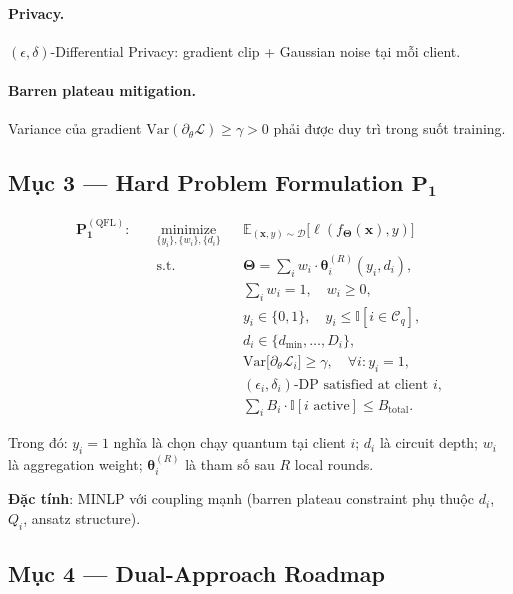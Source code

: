 \documentclass[11pt,a4paper]{article}
\begin{document}
\paragraph{Privacy.}
$(\epsilon, \delta)$-Differential Privacy: gradient clip + Gaussian noise tại mỗi client.

\paragraph{Barren plateau mitigation.}
Variance của gradient $\mathrm{Var}(\partial_\theta \mathcal{L}) \geq \gamma > 0$ phải được duy trì trong suốt training.

\subsection{Mục 3 --- Hard Problem Formulation $\mathbf{P_1}$}

$$
\begin{aligned}
\mathbf{P_1^{(\mathrm{QFL})}}: \quad
& \underset{\{y_i\}, \{w_i\}, \{d_i\}}{\text{minimize}}
  && \mathbb{E}_{(\mathbf{x}, y) \sim \mathcal{D}}\big[ \ell(f_{\boldsymbol{\Theta}}(\mathbf{x}), y) \big] \\
& \text{s.t.}
  && \boldsymbol{\Theta} = \sum_{i} w_i \cdot \boldsymbol{\theta}_i^{(R)}(y_i, d_i), \\
&  && \sum_{i} w_i = 1, \quad w_i \geq 0, \\
&  && y_i \in \{0, 1\}, \quad y_i \leq \mathbb{I}[i \in \mathcal{C}_q], \\
&  && d_i \in \{d_{\min}, \dots, D_i\}, \\
&  && \mathrm{Var}\big[\partial_\theta \mathcal{L}_i\big] \geq \gamma, \quad \forall i: y_i=1, \\
&  && (\epsilon_i, \delta_i)\text{-DP satisfied at client } i, \\
&  && \sum_i B_i \cdot \mathbb{I}[i \text{ active}] \leq B_{\mathrm{total}}.
\end{aligned}
$$

Trong đó: $y_i = 1$ nghĩa là chọn chạy quantum tại client $i$; $d_i$ là circuit depth; $w_i$ là aggregation weight; $\boldsymbol{\theta}_i^{(R)}$ là tham số sau $R$ local rounds.

\textbf{Đặc tính}: MINLP với coupling mạnh (barren plateau constraint phụ thuộc $d_i$, $Q_i$, ansatz structure).

\subsection{Mục 4 --- Dual-Approach Roadmap}
\end{document}
